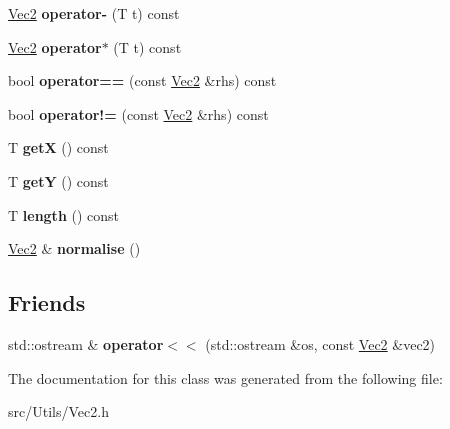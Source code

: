 \begin{DoxyCompactItemize}
\item 
\mbox{\label{classutil_1_1_vec2_a497cd4bc5a3a252548f110e6b813ed8d}} 
\mbox{\hyperlink{classutil_1_1_vec2}{Vec2}} {\bfseries operator-\/} (T t) const
\item 
\mbox{\label{classutil_1_1_vec2_ac4cfd2947b3b57d8c28275df009eac9b}} 
\mbox{\hyperlink{classutil_1_1_vec2}{Vec2}} {\bfseries operator$\ast$} (T t) const
\item 
\mbox{\label{classutil_1_1_vec2_a09da773414676c5ecc72f2b46129a470}} 
bool {\bfseries operator==} (const \mbox{\hyperlink{classutil_1_1_vec2}{Vec2}} \&rhs) const
\item 
\mbox{\label{classutil_1_1_vec2_a0229df6175193ca842accd550fbfe2ec}} 
bool {\bfseries operator!=} (const \mbox{\hyperlink{classutil_1_1_vec2}{Vec2}} \&rhs) const
\item 
\mbox{\label{classutil_1_1_vec2_a21e0c12bf04dd8f750666543dd4a7f8c}} 
T {\bfseries getX} () const
\item 
\mbox{\label{classutil_1_1_vec2_a081cd622c8de5763cb59eb59392e86b6}} 
T {\bfseries getY} () const
\item 
\mbox{\label{classutil_1_1_vec2_a37083307222b6c2a4e9411207f68f3b0}} 
T {\bfseries length} () const
\item 
\mbox{\label{classutil_1_1_vec2_aae214c359fd5e76575a07b68666df997}} 
\mbox{\hyperlink{classutil_1_1_vec2}{Vec2}} \& {\bfseries normalise} ()
\end{DoxyCompactItemize}
\subsection*{Friends}
\begin{DoxyCompactItemize}
\item 
\mbox{\label{classutil_1_1_vec2_aac26bca597ca8be5135e8c2b17a50762}} 
std\+::ostream \& {\bfseries operator$<$$<$} (std\+::ostream \&os, const \mbox{\hyperlink{classutil_1_1_vec2}{Vec2}} \&vec2)
\end{DoxyCompactItemize}


The documentation for this class was generated from the following file\+:\begin{DoxyCompactItemize}
\item 
src/\+Utils/Vec2.\+h\end{DoxyCompactItemize}
